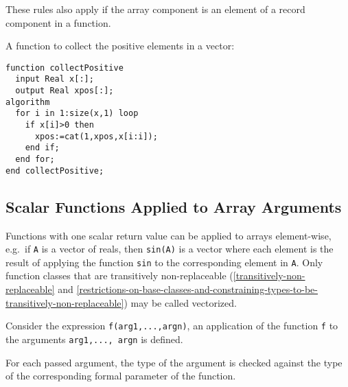These rules also apply if the array component is an element of a record
component in a function.

\begin{example}
A function to collect the positive elements in a vector:
\begin{lstlisting}[language=modelica]
function collectPositive
  input Real x[:];
  output Real xpos[:];
algorithm
  for i in 1:size(x,1) loop
    if x[i]>0 then
      xpos:=cat(1,xpos,x[i:i]);
    end if;
  end for;
end collectPositive;
\end{lstlisting}
\end{example}

\subsection{Scalar Functions Applied to Array Arguments}

Functions with one scalar return value can be applied to arrays
element-wise, e.g.\ if \lstinline!A! is a vector of reals, then \lstinline!sin(A)! is a vector
where each element is the result of applying the function \lstinline!sin! to the
corresponding element in \lstinline!A!. Only function classes that are transitively
non-replaceable (\autoref{transitively-non-replaceable} and \autoref{restrictions-on-base-classes-and-constraining-types-to-be-transitively-non-replaceable}) may be called vectorized.

Consider the expression \lstinline!f(arg1,...,argn)!, an application of the function
\lstinline!f! to the arguments \lstinline!arg1,..., argn! is defined.

For each passed argument, the type of the argument is checked against
the type of the corresponding formal parameter of the function.

